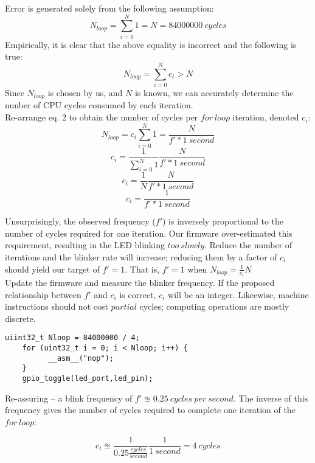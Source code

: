 \documentclass[a4paper,12pt]{article}   	%
\begin{document}
\begin{flushleft}

Error is generated solely from the following assumption:
$$N_{loop} = \sum_{i=0}^{N}1 = N = 84000000\ cycles$$
Empirically, it is clear that the above equality is incorrect and the following is true:
$$N_{loop} = \sum_{i=0}^{N}c_i > N$$
Since $N_{loop}$ is chosen by us, and $N$ is known, we can accurately 
determine the nunber of CPU cycles consumed by each iteration.\\[2 ex]

Re-arrange eq. 2 to obtain the number of cycles per $for\ loop$ iteration, denoted $c_i$:
$$N_{loop} = c_i\sum_{i=0}^{N} 1 = \frac{N}{f' * 1\ second}$$
$$c_i = \frac{1}{\sum_{i=0}^{N} 1} \frac{N}{f' * 1\ second}$$
$$c_i = \frac{1}{N} \frac{N}{f'*1\ second}$$
$$c_i = \frac{1}{f' * 1\ second}$$

Unsurprisingly, the observed frequency ($f'$) is inversely proportional to the number of cycles required for one iteration.
Our firmware over-estimated this requirement, resulting in the LED blinking $too\ slowly$. 
Reduce the number of iterations and the blinker rate will increase; reducing them by a factor of $c_i$ should yield our target of $f' = 1$.
That is, $f' = 1$ when $N_{loop} = \frac{1}{c_i}N$\\[2 ex]

Update the firmware and measure the blinker frequency. If the proposed relationship between $f'$ and $c_i$ is correct, 
$c_i$ will be an integer. Likeewise, machine instructions should not cost $partial$ cycles; computing operations are mostly discrete.\\[2 ex]

\begin{lstlisting}[backgroundcolor = \color{beige}]
    uiint32_t Nloop = 84000000 / 4;
    for (uint32_t i = 0; i < Nloop; i++) {
          __asm__("nop");
    }
    gpio_toggle(led_port,led_pin);
    \end{lstlisting}

Re-assuring -- a blink frequency of $f' \approxeq 0.25\ cycles\ per\ second$. The inverse of this frequency gives the 
number of cycles required to complete one iteration of the $for\ loop$:

$$c_i \approxeq \frac{1}{0.25 \frac{cycles}{second}} \frac{1}{1\ second} = 4\ cycles$$


\end{flushleft}
\end{document}
